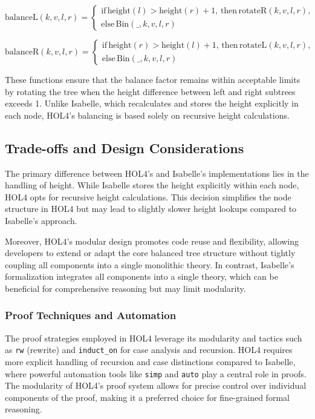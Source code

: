 \[
\text{balanceL}(k, v, l, r) = 
\begin{cases}
	\text{if} \, \text{height}(l) > \text{height}(r) + 1, \, \text{then} \, \text{rotateR}(k, v, l, r), \\
	\text{else} \, \text{Bin}(\_, k, v, l, r)
\end{cases}
\]

\[
\text{balanceR}(k, v, l, r) = 
\begin{cases}
	\text{if} \, \text{height}(r) > \text{height}(l) + 1, \, \text{then} \, \text{rotateL}(k, v, l, r), \\
	\text{else} \, \text{Bin}(\_, k, v, l, r)
\end{cases}
\]


These functions ensure that the balance factor remains within acceptable limits by rotating the tree when the height difference between left and right subtrees exceeds 1. Unlike Isabelle, which recalculates and stores the height explicitly in each node, HOL4’s balancing is based solely on recursive height calculations.

\subsection{Trade-offs and Design Considerations}
The primary difference between HOL4’s and Isabelle’s implementations lies in the handling of height. While Isabelle stores the height explicitly within each node, HOL4 opts for recursive height calculations. This decision simplifies the node structure in HOL4 but may lead to slightly slower height lookups compared to Isabelle’s approach.

Moreover, HOL4's modular design promotes code reuse and flexibility, allowing developers to extend or adapt the core balanced tree structure without tightly coupling all components into a single monolithic theory. In contrast, Isabelle's formalization integrates all components into a single theory, which can be beneficial for comprehensive reasoning but may limit modularity.

\subsubsection{Proof Techniques and Automation}
The proof strategies employed in HOL4 leverage its modularity and tactics such as \texttt{rw} (rewrite) and \texttt{induct\_on} for case analysis and recursion. HOL4 requires more explicit handling of recursion and case distinctions compared to Isabelle, where powerful automation tools like \texttt{simp} and \texttt{auto} play a central role in proofs. The modularity of HOL4’s proof system allows for precise control over individual components of the proof, making it a preferred choice for fine-grained formal reasoning.

